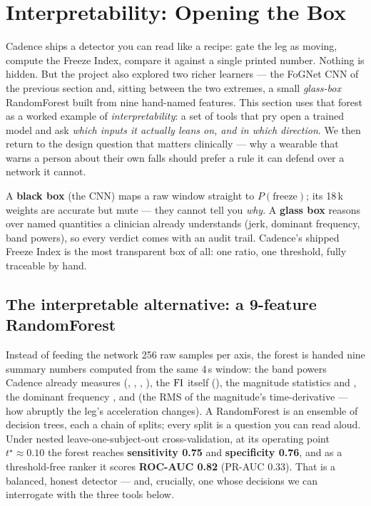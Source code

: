 \section{Interpretability: Opening the Box}
\label{sec:interpretability}

Cadence ships a detector you can read like a recipe: gate the leg as moving,
compute the Freeze Index, compare it against a single printed number. Nothing is
hidden. But the project also explored two richer learners --- the FoGNet CNN of the
previous section and, sitting between the two extremes, a small \emph{glass-box}
RandomForest built from nine hand-named features. This section uses that forest as a
worked example of \emph{interpretability}: a set of tools that pry open a trained
model and ask \emph{which inputs it actually leans on, and in which direction}. We
then return to the design question that matters clinically --- why a wearable that
warns a person about their own falls should prefer a rule it can defend over a
network it cannot.

\begin{keyidea}
A \textbf{black box} (the CNN) maps a raw window straight to $P(\text{freeze})$; its
18\,k weights are accurate but mute --- they cannot tell you \emph{why}. A
\textbf{glass box} reasons over named quantities a clinician already understands
(jerk, dominant frequency, band powers), so every verdict comes with an audit trail.
Cadence's shipped Freeze Index is the most transparent box of all: one ratio, one
threshold, fully traceable by hand.
\end{keyidea}

\subsection{The interpretable alternative: a 9-feature RandomForest}

Instead of feeding the network 256 raw samples per axis, the forest is handed nine
summary numbers computed from the same 4\,s window: the band powers Cadence already
measures (, , ,
), the $\mathrm{FI}$ itself (), the magnitude
statistics  and , the dominant frequency
, and  (the RMS of the magnitude's time-derivative ---
how abruptly the leg's acceleration changes). A RandomForest is an ensemble of
decision trees, each a chain of  splits; every split
is a question you can read aloud. Under nested leave-one-subject-out
cross-validation, at its operating point $t^\star\!\approx\!0.10$ the forest reaches
\textbf{sensitivity 0.75} and \textbf{specificity 0.76}, and as a threshold-free
ranker it scores \textbf{ROC-AUC 0.82} (PR-AUC 0.33). That is a balanced,
honest detector --- and, crucially, one whose decisions we can interrogate with the
three tools below.

